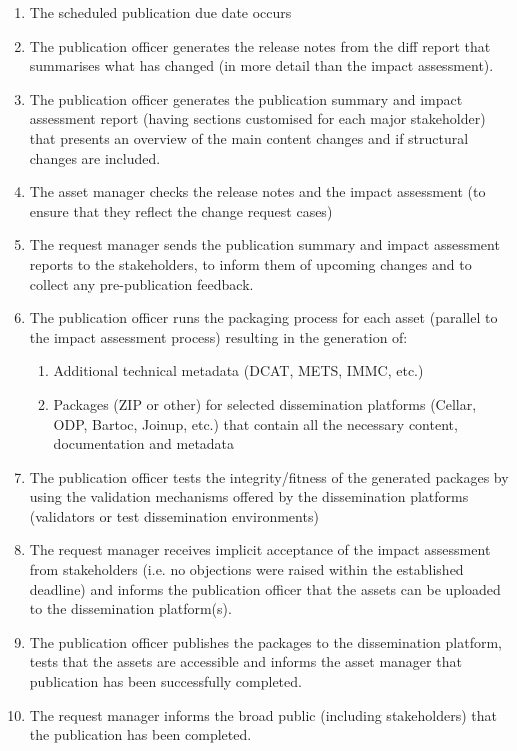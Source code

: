 	\begin{enumerate}
		\item The scheduled publication due date occurs
		\item The publication officer generates the release notes from the diff report that summarises what has changed (in more detail than the impact assessment).
		\item The publication officer generates the publication summary and impact assessment report (having sections customised for each major stakeholder) that presents an overview of the main content changes and if structural changes are included. 
		\item The asset manager checks the release notes and the impact assessment (to ensure that they reflect the change request cases)
		\item The request manager sends the publication summary and impact assessment reports to the stakeholders, to inform them of upcoming changes and to collect any pre-publication feedback.
		\item The publication officer runs the packaging process for each asset (parallel to the impact assessment process) resulting in the generation of: 
		\begin{enumerate}
			\item Additional technical metadata (DCAT, METS, IMMC, etc.)
			\item Packages (ZIP or other) for selected dissemination platforms (Cellar, ODP, Bartoc, Joinup, etc.) that contain all the necessary content, documentation and metadata
		\end{enumerate}
		\item The publication officer tests the integrity/fitness of the generated packages by using the validation mechanisms offered by the dissemination platforms (validators or test dissemination environments)
		\item The request manager receives implicit acceptance of the impact assessment from stakeholders (i.e. no objections were raised within the established deadline) and informs the publication officer that the assets can be uploaded to the dissemination platform(s). 
		\item The publication officer publishes the packages to the dissemination platform, tests that the assets are accessible and informs the asset manager that publication has been successfully completed.
		\item The request manager informs the broad public (including stakeholders) that the publication has been completed.
		
	\end{enumerate}
	
